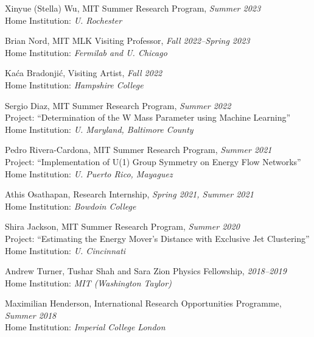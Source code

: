 \bbl

\item Xinyue (Stella) Wu, MIT Summer Research Program, \emph{Summer 2023}
\\ Home Institution: \emph{U. Rochester}

\item Brian Nord, MIT MLK Visiting Professor, \emph{Fall 2022--Spring 2023}
\\ Home Institution: \emph{Fermilab and U. Chicago}

\item Kaća Bradonjić, Visiting Artist, \emph{Fall 2022}
\\ Home Institution: \emph{Hampshire College}

\item Sergio Diaz, MIT Summer Research Program, \emph{Summer 2022}
\\ Project: ``Determination of the W Mass Parameter using Machine Learning''
\\ Home Institution: \emph{U. Maryland, Baltimore County}

\item Pedro Rivera-Cardona, MIT Summer Research Program, \emph{Summer 2021}
\\ Project: ``Implementation of U(1) Group Symmetry on Energy Flow Networks''
\\ Home Institution: \emph{U. Puerto Rico, Mayaguez}

\item Athis Osathapan, Research Internship, \emph{Spring 2021, Summer 2021}
\\ Home Institution: \emph{Bowdoin College}

\item Shira Jackson, MIT Summer Research Program, \emph{Summer 2020}
\\ Project: ``Estimating the Energy Mover’s Distance with Exclusive Jet Clustering''
\\ Home Institution: \emph{U. Cincinnati}

\item Andrew Turner, Tushar Shah and Sara Zion Physics Fellowship, \emph{2018--2019}
\\ Home Institution: \emph{MIT (Washington Taylor)}

\item Maximilian Henderson, International Research Opportunities Programme, \emph{Summer 2018}
\\ Home Institution: \emph{Imperial College London}

